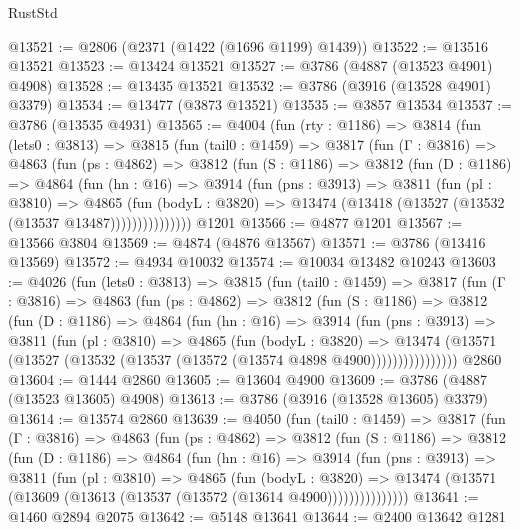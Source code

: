 \begin{lexlean}{RustStd}
\begin{coremodule}
@13521 := @2806 (@2371 (@1422 (@1696 @1199) @1439))
@13522 := @13516 @13521
@13523 := @13424 @13521
@13527 := @3786 (@4887 (@13523 @4901) @4908)
@13528 := @13435 @13521
@13532 := @3786 (@3916 (@13528 @4901) @3379)
@13534 := @13477 (@3873 @13521)
@13535 := @3857 @13534
@13537 := @3786 (@13535 @4931)
@13565 := @4004
    (fun (rty : @1186) =>
    @3814
      (fun (lets0 : @3813) =>
      @3815
        (fun (tail0 : @1459) =>
        @3817
          (fun (Γ : @3816) =>
          @4863
            (fun (ps : @4862) =>
            @3812
              (fun (S : @1186) =>
              @3812
                (fun (D : @1186) =>
                @4864
                  (fun (hn : @16) =>
                  @3914
                    (fun (pns : @3913) =>
                    @3811
                      (fun (pl : @3810) =>
                      @4865
                        (fun (bodyL : @3820) =>
                        @13474 (@13418 (@13527 (@13532 (@13537 @13487)))))))))))))))
    @1201
@13566 := @4877 @1201
@13567 := @13566 @3804
@13569 := @4874 (@4876 @13567)
@13571 := @3786 (@13416 @13569)
@13572 := @4934 @10032
@13574 := @10034 @13482 @10243
@13603 := @4026
    (fun (lets0 : @3813) =>
    @3815
      (fun (tail0 : @1459) =>
      @3817
        (fun (Γ : @3816) =>
        @4863
          (fun (ps : @4862) =>
          @3812
            (fun (S : @1186) =>
            @3812
              (fun (D : @1186) =>
              @4864
                (fun (hn : @16) =>
                @3914
                  (fun (pns : @3913) =>
                  @3811
                    (fun (pl : @3810) =>
                    @4865
                      (fun (bodyL : @3820) =>
                      @13474
                        (@13571 (@13527 (@13532 (@13537 (@13572 (@13574 @4898 @4900))))))))))))))))
    @2860
@13604 := @1444 @2860
@13605 := @13604 @4900
@13609 := @3786 (@4887 (@13523 @13605) @4908)
@13613 := @3786 (@3916 (@13528 @13605) @3379)
@13614 := @13574 @2860
@13639 := @4050
    (fun (tail0 : @1459) =>
    @3817
      (fun (Γ : @3816) =>
      @4863
        (fun (ps : @4862) =>
        @3812
          (fun (S : @1186) =>
          @3812
            (fun (D : @1186) =>
            @4864
              (fun (hn : @16) =>
              @3914
                (fun (pns : @3913) =>
                @3811
                  (fun (pl : @3810) =>
                  @4865
                    (fun (bodyL : @3820) =>
                    @13474 (@13571 (@13609 (@13613 (@13537 (@13572 (@13614 @4900)))))))))))))))
@13641 := @1460 @2894 @2075
@13642 := @5148 @13641
@13644 := @2400 @13642 @1281

\end{coremodule}
\end{lexlean}
